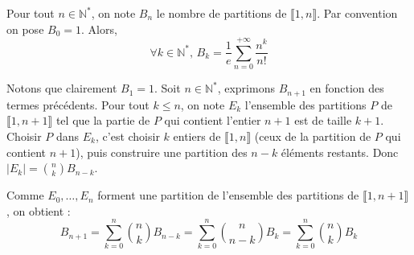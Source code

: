 





	\begin{theorem}
		Pour tout $n \in \mathbb{N}^*$, on note $B_n$ le nombre de partitions de $\llbracket 1, n \rrbracket$. Par convention on pose $B_0 = 1$. Alors,
		\[ \forall k \in \mathbb{N}^*, \, B_k = \frac{1}{e} \sum_{n=0}^{+\infty} \frac{n^k}{n!} \]
	\end{theorem}

	\begin{demonstration}
		Notons que clairement $B_1 = 1$. Soit $n \in \mathbb{N}^*$, exprimons $B_{n+1}$ en fonction des termes précédents. Pour tout $k \leq n$, on note $E_k$ l'ensemble des partitions $P$ de $\llbracket 1, n+1 \rrbracket$ tel que la partie de $P$ qui contient l'entier $n+1$ est de taille $k+1$. Choisir $P$ dans $E_k$, c'est choisir $k$ entiers de $\llbracket 1, n \rrbracket$ (ceux de la partition de $P$ qui contient $n+1$), puis construire une partition des $n-k$ éléments restants. Donc $|E_k| = \binom{n}{k} B_{n-k}$.

		\medskip
		Comme $E_0, \dots, E_n$ forment une partition de l'ensemble des partitions de $\llbracket 1, n+1 \rrbracket$, on obtient :
		\[ B_{n+1} = \sum_{k=0}^n \binom{n}{k} B_{n-k} = \sum_{k=0}^n \binom{n}{n-k} B_k = \sum_{k=0}^n \binom{n}{k} B_k \tag{$*$} \]


\end{demonstration}
